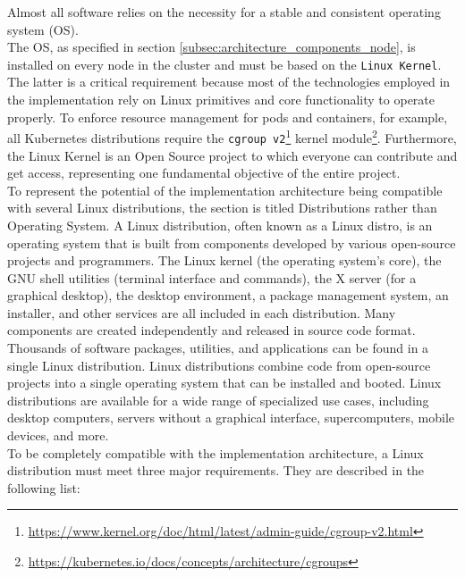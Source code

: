 Almost all software relies on the necessity for a stable and consistent operating
system (OS). \\ %
The OS, as specified in section \ref{subsec:architecture_components_node}, is installed
on every node in the cluster and must be based on the \texttt{Linux Kernel}. The
latter is a critical requirement because most of the technologies employed in the
implementation rely on Linux primitives and core functionality to operate properly.
To enforce resource management for pods and containers, for example, all
Kubernetes distributions require the \texttt{cgroup v2}\footnote{\url{https://www.kernel.org/doc/html/latest/admin-guide/cgroup-v2.html}}
kernel module\footnote{\url{https://kubernetes.io/docs/concepts/architecture/cgroups}}.
Furthermore, the Linux Kernel is an Open Source project to which everyone can contribute
and get access, representing one fundamental objective of the entire project. \\ %
To represent the potential of the implementation architecture being compatible
with several Linux distributions, the section is titled Distributions rather than
Operating System. A Linux distribution, often known as a Linux distro, is an
operating system that is built from components developed by various open-source
projects and programmers. The Linux kernel (the operating system's core), the
GNU shell utilities (terminal interface and commands), the X server (for a
graphical desktop), the desktop environment, a package management system, an
installer, and other services are all included in each distribution. Many
components are created independently and released in source code format. Thousands
of software packages, utilities, and applications can be found in a single Linux
distribution. Linux distributions combine code from open-source projects into a
single operating system that can be installed and booted. Linux distributions are
available for a wide range of specialized use cases, including desktop computers,
servers without a graphical interface, supercomputers, mobile devices, and more\cite{linux_distro}.
\\ %
To be completely compatible with the implementation architecture, a Linux
distribution must meet three major requirements. They are described in the following
list:
